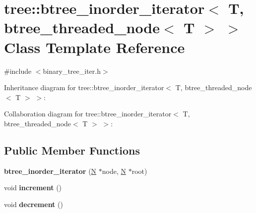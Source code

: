 \hypertarget{classtree_1_1btree__inorder__iterator_3_01T_00_01btree__threaded__node_3_01T_01_4_01_4}{\section{tree\-:\-:btree\-\_\-inorder\-\_\-iterator$<$ T, btree\-\_\-threaded\-\_\-node$<$ T $>$ $>$ Class Template Reference}
\label{classtree_1_1btree__inorder__iterator_3_01T_00_01btree__threaded__node_3_01T_01_4_01_4}
}


{\ttfamily \#include $<$binary\-\_\-tree\-\_\-iter.\-h$>$}



Inheritance diagram for tree\-:\-:btree\-\_\-inorder\-\_\-iterator$<$ T, btree\-\_\-threaded\-\_\-node$<$ T $>$ $>$\-:


Collaboration diagram for tree\-:\-:btree\-\_\-inorder\-\_\-iterator$<$ T, btree\-\_\-threaded\-\_\-node$<$ T $>$ $>$\-:
\subsection*{Public Member Functions}
\begin{DoxyCompactItemize}
\item 
\hypertarget{classtree_1_1btree__inorder__iterator_3_01T_00_01btree__threaded__node_3_01T_01_4_01_4_afd6683f0b4f5a8336d41497ed5d442d9}{{\bfseries btree\-\_\-inorder\-\_\-iterator} (\hyperlink{structtree_1_1btree__threaded__node}{N} $\ast$node, \hyperlink{structtree_1_1btree__threaded__node}{N} $\ast$root)}\label{classtree_1_1btree__inorder__iterator_3_01T_00_01btree__threaded__node_3_01T_01_4_01_4_afd6683f0b4f5a8336d41497ed5d442d9}

\item 
\hypertarget{classtree_1_1btree__inorder__iterator_3_01T_00_01btree__threaded__node_3_01T_01_4_01_4_ad7bab9e59be6a764fd33a2aa7b938217}{void {\bfseries increment} ()}\label{classtree_1_1btree__inorder__iterator_3_01T_00_01btree__threaded__node_3_01T_01_4_01_4_ad7bab9e59be6a764fd33a2aa7b938217}

\item 
\hypertarget{classtree_1_1btree__inorder__iterator_3_01T_00_01btree__threaded__node_3_01T_01_4_01_4_aa1c7f49bf110199f92d201bebbd475f9}{void {\bfseries decrement} ()}\label{classtree_1_1btree__inorder__iterator_3_01T_00_01btree__threaded__node_3_01T_01_4_01_4_aa1c7f49bf110199f92d201bebbd475f9}

\end{DoxyCompactItemize}
